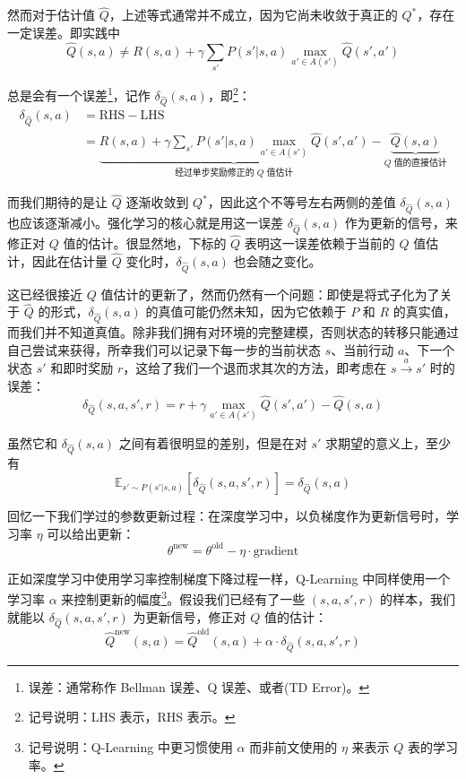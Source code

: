 然而对于估计值 $\hat Q$，上述等式通常并不成立，因为它尚未收敛于真正的 $Q^*$，存在一定误差。即实践中
\[
    \hat Q (s, a) \ne R(s, a) + \gamma \sum_{s'} P(s' | s, a) \max_{a' \in A(s')} \hat Q (s', a')
\]

总是会有一个误差\footnote{误差：通常称作 Bellman 误差、Q 误差、或者(TD Error)。}，记作 $\delta_{\hat Q} (s, a)$，即\footnote{记号说明：$\text{LHS}$ 表示，$\text{RHS}$ 表示。}：
\[
\begin{aligned}
    \delta_{\hat Q} (s, a) &= \text{RHS} - \text{LHS} \\
    &= \underset{\text{经过单步奖励修正的 $Q$ 值估计}}{\underbrace{R(s, a) + \gamma \sum_{s'} P(s' | s, a) \max_{a' \in A(s')} \hat Q (s', a')}} - \underset{\text{$Q$ 值的直接估计}}{\underbrace{\hat Q (s, a)}}
\end{aligned}
\]

而我们期待的是让 $\hat Q$ 逐渐收敛到 $Q^*$，因此这个不等号左右两侧的差值 $\delta_{\hat Q} (s, a)$ 也应该逐渐减小。强化学习的核心就是用这一误差 $\delta_{\hat Q} (s, a)$ 作为更新的信号，来修正对 $Q$ 值的估计。很显然地，下标的 $\hat Q$ 表明这一误差依赖于当前的 $Q$ 值估计，因此在估计量 $\hat Q$ 变化时，$\delta_{\hat Q} (s, a)$ 也会随之变化。

这已经很接近 $Q$ 值估计的更新了，然而仍然有一个问题：即使是将式子化为了关于 $\hat Q$ 的形式，$\delta_{\hat Q} (s, a)$ 的真值可能仍然未知，因为它依赖于 $P$ 和 $R$ 的真实值，而我们并不知道真值。除非我们拥有对环境的完整建模，否则状态的转移只能通过自己尝试来获得，所幸我们可以记录下每一步的当前状态 $s$、当前行动 $a$、下一个状态 $s'$ 和即时奖励 $r$，这给了我们一个退而求其次的方法，即考虑在 $s \overset{a}{\to} s'$ 时的误差：
\[
    \delta_{\hat Q} (s, a, s', r) = r + \gamma \max_{a' \in A(s')} \hat Q (s', a') - \hat Q (s, a)
\]

虽然它和 $\delta_{\hat Q} (s, a)$ 之间有着很明显的差别，但是在对 $s'$ 求期望的意义上，至少有
\[
    \mathbb{E}_{s' \sim P(s' | s, a)}[\delta_{\hat Q} (s, a, s', r)] = \delta_{\hat Q} (s, a)
\]

回忆一下我们学过的参数更新过程：在深度学习中，以负梯度作为更新信号时，学习率 $\eta$ 可以给出更新：
\[
    \theta^{\text{new}} = \theta^{\text{old}} - \eta \cdot \text{gradient}
\]

正如深度学习中使用学习率控制梯度下降过程一样，Q-Learning 中同样使用一个学习率 $\alpha$ 来控制更新的幅度\footnote{记号说明：Q-Learning 中更习惯使用 $\alpha$ 而非前文使用的 $\eta$ 来表示 $Q$ 表的学习率。}。假设我们已经有了一些 $(s, a, s', r)$ 的样本，我们就能以 $\delta_{\hat Q} (s, a, s', r)$ 为更新信号，修正对 $Q$ 值的估计：
\[
    \hat Q^{\text{new}} (s, a) = \hat Q^{\text{old}} (s, a) + \alpha \cdot \delta_{\hat Q} (s, a, s', r)
\]

